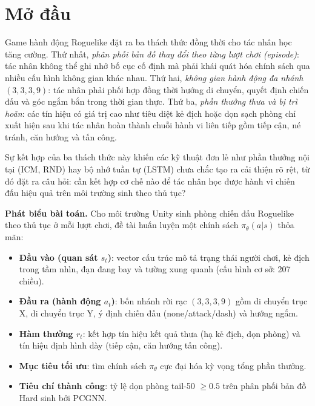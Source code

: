 \clearpage
{}

\chapter*{Mở đầu}


Game hành động Roguelike đặt ra ba thách thức đồng thời cho tác nhân học tăng cường. Thứ nhất, \textit{phân phối bản đồ thay đổi theo từng lượt chơi (episode)}: tác nhân không thể ghi nhớ bố cục cố định mà phải khái quát hóa chính sách qua nhiều cấu hình không gian khác nhau. Thứ hai, \textit{không gian hành động đa nhánh $(3,3,3,9)$}: tác nhân phải phối hợp đồng thời hướng di chuyển, quyết định chiến đấu và góc ngắm bắn trong thời gian thực. Thứ ba, \textit{phần thưởng thưa và bị trì hoãn}: các tín hiệu có giá trị cao như tiêu diệt kẻ địch hoặc dọn sạch phòng chỉ xuất hiện sau khi tác nhân hoàn thành chuỗi hành vi liên tiếp gồm tiếp cận, né tránh, căn hướng và tấn công.

Sự kết hợp của ba thách thức này khiến các kỹ thuật đơn lẻ như phần thưởng nội tại (ICM, RND) hay bộ nhớ tuần tự (LSTM) chưa chắc tạo ra cải thiện rõ rệt, từ đó đặt ra câu hỏi: cần kết hợp cơ chế nào để tác nhân học được hành vi chiến đấu hiệu quả trên môi trường sinh theo thủ tục?

\vspace{0.3cm}
\noindent\textbf{Phát biểu bài toán.} Cho môi trường Unity sinh phòng chiến đấu Roguelike theo thủ tục ở mỗi lượt chơi, đề tài huấn luyện một chính sách $\pi_\theta(a|s)$ thỏa mãn:

\begin{itemize}
    \item \textbf{Đầu vào (quan sát $s_t$)}: vector cấu trúc mô tả trạng thái người chơi, kẻ địch trong tầm nhìn, đạn đang bay và tường xung quanh (cấu hình cơ sở: 207 chiều).
    \item \textbf{Đầu ra (hành động $a_t$)}: bốn nhánh rời rạc $(3,3,3,9)$ gồm di chuyển trục X, di chuyển trục Y, ý định chiến đấu (none/attack/dash) và hướng ngắm.
    \item \textbf{Hàm thưởng $r_t$}: kết hợp tín hiệu kết quả thưa (hạ kẻ địch, dọn phòng) và tín hiệu định hình dày (tiếp cận, căn hướng tấn công).
    \item \textbf{Mục tiêu tối ưu}: tìm chính sách $\pi_\theta$ cực đại hóa kỳ vọng tổng phần thưởng.
    \item \textbf{Tiêu chí thành công}: tỷ lệ dọn phòng tail-50 $\geq 0.5$ trên phân phối bản đồ Hard sinh bởi PCGNN.
\end{itemize}

